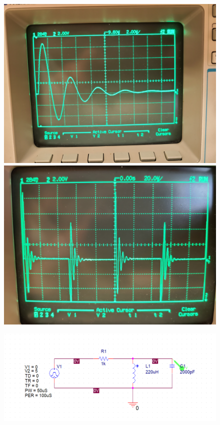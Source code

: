 \documentclass[11pt]{article}
\begin{document}
	\begin{figure}[H]
		\centering
		\includegraphics[width=6.in]{images/20210305_141643.jpg}
		\includegraphics[width=6.in]{images/20210305_141728.jpg}
	\end{figure}
	\begin{figure}[H]
		\centering
		\includegraphics[width=6.in]{images/Orcad Schematic.PNG}
	\end{figure}
	
\end{document}
